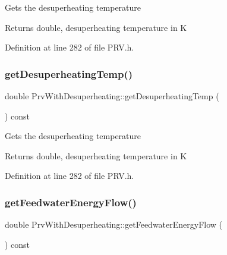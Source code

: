 Gets the desuperheating temperature

\begin{DoxyReturn}{Returns}
double, desuperheating temperature in K 
\end{DoxyReturn}


Definition at line 282 of file P\+R\+V.\+h.

\mbox{\label{class_prv_with_desuperheating_af334a9ff9a14d110cb2851a76d5d84fb}} 
\subsubsection{\texorpdfstring{get\+Desuperheating\+Temp()}{getDesuperheatingTemp()}\hspace{0.1cm}{\footnotesize\ttfamily [3/3]}}
{\footnotesize\ttfamily double Prv\+With\+Desuperheating\+::get\+Desuperheating\+Temp (\begin{DoxyParamCaption}{ }\end{DoxyParamCaption}) const\hspace{0.3cm}{\ttfamily [inline]}}

Gets the desuperheating temperature

\begin{DoxyReturn}{Returns}
double, desuperheating temperature in K 
\end{DoxyReturn}


Definition at line 282 of file P\+R\+V.\+h.

\mbox{\label{class_prv_with_desuperheating_a42945a77fcdbaf1e1844c444c696f8b0}} 
\subsubsection{\texorpdfstring{get\+Feedwater\+Energy\+Flow()}{getFeedwaterEnergyFlow()}\hspace{0.1cm}{\footnotesize\ttfamily [1/3]}}
{\footnotesize\ttfamily double Prv\+With\+Desuperheating\+::get\+Feedwater\+Energy\+Flow (\begin{DoxyParamCaption}{ }\end{DoxyParamCaption}) const\hspace{0.3cm}{\ttfamily [inline]}}

